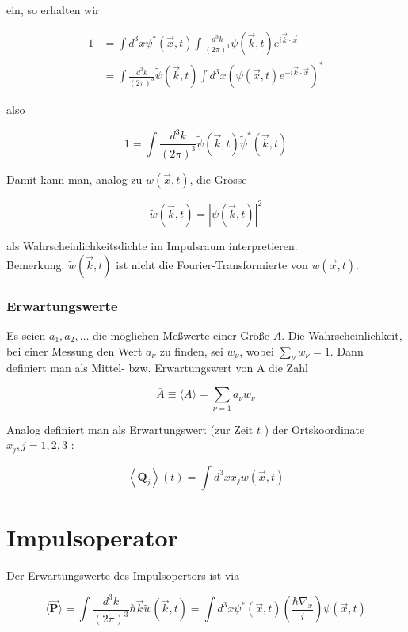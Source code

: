 \documentclass[10pt, letterpaper]{article}
\begin{document}
ein, so erhalten wir

$$
\begin{aligned}
1 & =\int d^{3} x \psi^{*}(\vec{x}, t) \int \frac{d^{3} k}{(2 \pi)^{3}} \tilde{\psi}(\vec{k}, t) e^{i \vec{k} \cdot \vec{x}} \\
& =\int \frac{d^{3} k}{(2 \pi)^{3}} \tilde{\psi}(\vec{k}, t) \int d^{3} x\left(\psi(\vec{x}, t) e^{-i \vec{k} \cdot \vec{x}}\right)^{*}
\end{aligned}
$$

also

$$
1=\int \frac{d^{3} k}{(2 \pi)^{3}} \tilde{\psi}(\vec{k}, t) \tilde{\psi}^{*}(\vec{k}, t)
$$

Damit kann man, analog zu $w(\vec{x}, t)$, die Grösse

$$
\tilde{w}(\vec{k}, t)=|\tilde{\psi}(\vec{k}, t)|^{2}
$$

als Wahrscheinlichkeitsdichte im Impulsraum interpretieren.\\
Bemerkung: $\tilde{w}(\vec{k}, t)$ ist nicht die Fourier-Transformierte von $w(\vec{x}, t)$.

\subsubsection*{Erwartungswerte}
Es seien $a_{1}, a_{2}, \ldots$ die möglichen Meßwerte einer Größe $A$. Die Wahrscheinlichkeit, bei einer Messung den Wert $a_{\nu}$ zu finden, sei $w_{\nu}$, wobei $\sum_{\nu} w_{\nu}=1$. Dann definiert man als Mittel- bzw. Erwartungswert von A die Zahl

$$
\bar{A} \equiv\langle A\rangle=\sum_{\nu=1} a_{\nu} w_{\nu}
$$

Analog definiert man als Erwartungswert (zur Zeit $t$ ) der Ortskoordinate $x_{j}, j=1,2,3$ :

$$
\left\langle\mathbf{Q}_{j}\right\rangle(t)=\int d^{3} x x_{j} w(\vec{x}, t)
$$

\section*{Impulsoperator}
Der Erwartungswerte des Impulsopertors ist via

$$
\langle\overrightarrow{\mathbf{P}}\rangle=\int \frac{d^{3} k}{(2 \pi)^{3}} \hbar \vec{k} \tilde{w}(\vec{k}, t)=\int d^{3} x \psi^{*}(\vec{x}, t)\left(\frac{\hbar \nabla_{x}}{i}\right) \psi(\vec{x}, t)
$$
\end{document}
